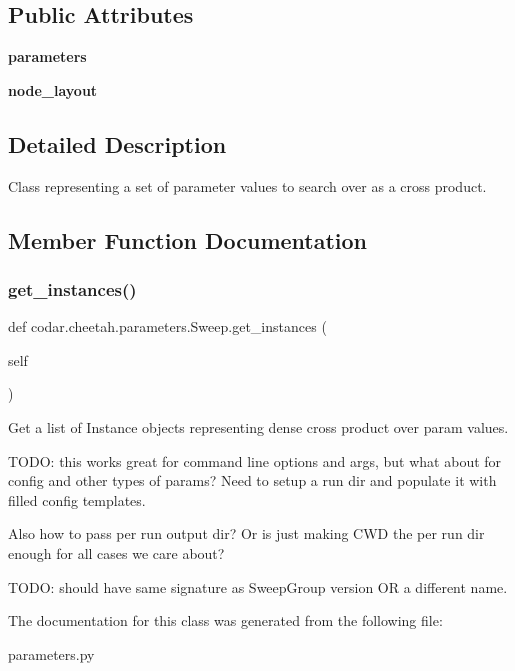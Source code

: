 \subsection*{Public Attributes}
\begin{DoxyCompactItemize}
\item 
\mbox{\label{classcodar_1_1cheetah_1_1parameters_1_1_sweep_a5150062c13d48ec754188e4806958879}} 
{\bfseries parameters}
\item 
\mbox{\label{classcodar_1_1cheetah_1_1parameters_1_1_sweep_a2f9c8f2db28d801a5148904e85af06c6}} 
{\bfseries node\+\_\+layout}
\end{DoxyCompactItemize}


\subsection{Detailed Description}
\begin{DoxyVerb}Class representing a set of parameter values to search over as
a cross product.
\end{DoxyVerb}
 

\subsection{Member Function Documentation}
\mbox{\label{classcodar_1_1cheetah_1_1parameters_1_1_sweep_a25c111a2541f852d385d84baf51e9687}} 
\subsubsection{\texorpdfstring{get\+\_\+instances()}{get\_instances()}}
{\footnotesize\ttfamily def codar.\+cheetah.\+parameters.\+Sweep.\+get\+\_\+instances (\begin{DoxyParamCaption}\item[{}]{self }\end{DoxyParamCaption})}

\begin{DoxyVerb}Get a list of Instance objects representing dense cross product over
param values.

TODO: this works great for command line options and args, but
what about for config and other types of params? Need to setup
a run dir and populate it with filled config templates.

Also how to pass per run output dir? Or is just making CWD the
per run dir enough for all cases we care about?

TODO: should have same signature as SweepGroup version OR a
different name.
\end{DoxyVerb}
 

The documentation for this class was generated from the following file\+:\begin{DoxyCompactItemize}
\item 
parameters.\+py\end{DoxyCompactItemize}
